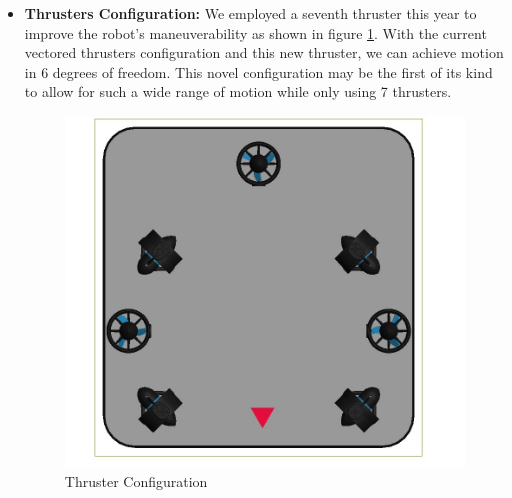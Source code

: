 \vspace{-0.5\baselineskip}
\begin{itemize}[leftmargin=0pt, itemindent=10pt]
    \setlength{\itemsep}{0pt}   
    \item \textbf{Thrusters Configuration:} We employed a seventh thruster this year to improve the robot's maneuverability as shown in figure \ref{fig:thruster}. With the current vectored thrusters configuration and this new thruster, we can achieve motion in 6 degrees of freedom. This novel configuration may be the first of its kind to allow for such a wide range of motion while only using 7 thrusters.
    \begin{figure}[h]
        \centering
        \includegraphics[width=0.8\columnwidth]{Sections/2Design Rationale/images/Thrusters.png}
        \caption{Thruster Configuration}
        \label{fig:thruster}
    \end{figure}


\end{itemize}
